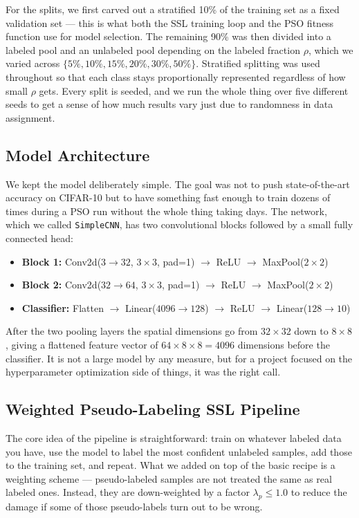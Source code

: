 \documentclass[journal]{IEEEtran}
\begin{document}
For the splits, we first carved out a stratified 10\% of the training set as
a fixed validation set --- this is what both the SSL training loop and the PSO
fitness function use for model selection. The remaining 90\% was then divided
into a labeled pool and an unlabeled pool depending on the labeled fraction
$\rho$, which we varied across $\{5\%, 10\%, 15\%, 20\%, 30\%, 50\%\}$.
Stratified splitting was used throughout so that each class stays
proportionally represented regardless of how small $\rho$ gets. Every split
is seeded, and we run the whole thing over five different seeds to get a
sense of how much results vary just due to randomness in data assignment.

\subsection{Model Architecture}

We kept the model deliberately simple. The goal was not to push
state-of-the-art accuracy on CIFAR-10 but to have something fast enough to
train dozens of times during a PSO run without the whole thing taking days.
The network, which we called \texttt{SimpleCNN}, has two convolutional blocks
followed by a small fully connected head:

\begin{itemize}
    \item \textbf{Block 1:} Conv2d($3{\to}32$, $3{\times}3$, pad=1) $\to$
    ReLU $\to$ MaxPool($2{\times}2$)
    \item \textbf{Block 2:} Conv2d($32{\to}64$, $3{\times}3$, pad=1) $\to$
    ReLU $\to$ MaxPool($2{\times}2$)
    \item \textbf{Classifier:} Flatten $\to$ Linear($4096{\to}128$) $\to$
    ReLU $\to$ Linear($128{\to}10$)
\end{itemize}

After the two pooling layers the spatial dimensions go from $32{\times}32$
down to $8{\times}8$, giving a flattened feature vector of
$64 \times 8 \times 8 = 4096$ dimensions before the classifier. It is not a
large model by any measure, but for a project focused on the hyperparameter
optimization side of things, it was the right call.

\subsection{Weighted Pseudo-Labeling SSL Pipeline}

The core idea of the pipeline is straightforward: train on whatever labeled
data you have, use the model to label the most confident unlabeled samples,
add those to the training set, and repeat. What we added on top of the basic
recipe is a weighting scheme --- pseudo-labeled samples are not treated the
same as real labeled ones. Instead, they are down-weighted by a factor
$\lambda_p \leq 1.0$ to reduce the damage if some of those pseudo-labels turn
out to be wrong.
\end{document}
